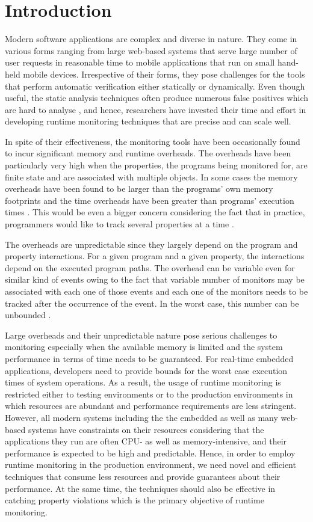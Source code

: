\section{Introduction}
\label{sec:introduction}

Modern software applications are complex and diverse in nature. They come in 
various forms ranging from large web-based systems that serve large number of 
user requests in reasonable time to mobile applications that run on small 
hand-held mobile devices. Irrespective of their forms, they pose challenges for 
the tools that perform automatic verification either statically or dynamically. 
Even though useful, the static analysis techniques often produce numerous false 
positives which are hard to analyse \cite{}, and hence, researchers have 
invested their time and effort in developing runtime monitoring techniques that 
are precise and can scale well.

In spite of their effectiveness, the monitoring tools have been occasionally 
found to incur significant memory and runtime overheads. The overheads have been 
particularly very high when the properties, the programs being monitored for, 
are finite state and are associated with multiple objects. In some cases the 
memory overheads have been found to be larger than the programs' own memory 
footprints and the time overheads have been greater than programs' execution 
times \cite{}. This would be even a bigger concern considering the fact that in 
practice, programmers would like to track several properties at a time \cite{}.

The overheads are unpredictable since they largely depend on the program and 
property interactions. For a given program and a given property, the 
interactions depend on the executed program paths. The overhead can be variable 
even for similar kind of events owing to the fact that variable number of 
monitors may be associated with each one of those events and each one of the 
monitors needs to be tracked after the occurrence of the event. In the worst 
case, this number can be unbounded \cite{}.

Large overheads and their unpredictable nature pose serious challenges to 
monitoring especially when the available memory is limited and the system 
performance in terms of time needs to be guaranteed. For real-time embedded 
applications, developers need to provide bounds for the worst case execution 
times of system operations. As a result, the usage of runtime monitoring is 
restricted either to testing environments or to the production environments in 
which resources are abundant and performance requirements are less stringent. 
However, all modern systems including the the embedded as well as many web-based 
systems have constraints on their resources considering that the applications 
they run are often CPU- as well as memory-intensive, and their performance is 
expected to be high and predictable. Hence, in order to employ runtime 
monitoring in the production environment, we need novel and efficient techniques 
that consume less resources and provide guarantees about their performance. At 
the same time, the 
techniques should also be effective in catching property violations which is the 
primary objective of runtime monitoring.

